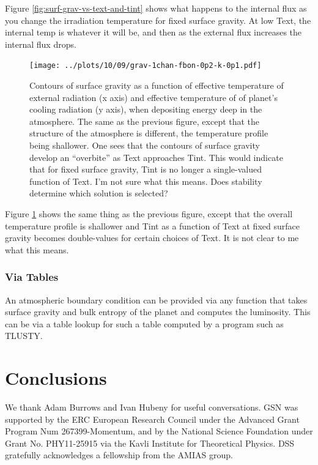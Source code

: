 \documentclass{emulateapj}
\begin{document}
Figure \ref{fig:surf-grav-vs-text-and-tint} shows what happens to the
internal flux as you change the irradiation temperature for fixed
surface gravity.  At low Text, the internal temp is whatever it will
be, and then as the external flux increases the internal flux drops.  

\begin{figure}
\texttt{[image: ../plots/10/09/grav-1chan-fbon-0p2-k-0p1.pdf]}
\caption{Contours of surface gravity as a function of effective
  temperature of external radiation (x axis) and effective temperature
  of of planet's cooling radiation (y axis), when depositing energy
  deep in the atmosphere.  The same as the previous figure, except
  that the structure of the atmosphere is different, the temperature
  profile being shallower.  One sees that the contours of surface
  gravity develop an ``overbite'' as Text approaches Tint.  This would
  indicate that for fixed surface gravity, Tint is no longer a
  single-valued function of Text.  I'm not sure what this means.  Does
  stability determine which solution is selected?}
\label{fig:surf-grav-vs-text-and-tint-shallow-temp-profile}
\end{figure}

Figure \ref{fig:surf-grav-vs-text-and-tint-shallow-temp-profile} shows
the same thing as the previous figure, except that the overall
temperature profile is shallower and Tint as a function of Text at
fixed surface gravity becomes double-values for certain choices of
Text.  It is not clear to me what this means.  

\subsubsection{Via Tables}

An atmospheric boundary condition can be provided via any function
that takes surface gravity and bulk entropy of the planet and computes
the luminosity.  This can be via a table lookup for such a table
computed by a program such as TLUSTY.

\section{Conclusions}
\label{sec:conc}

\acknowledgements

We thank Adam Burrows and Ivan Hubeny for useful conversations.  GSN
was supported by the ERC European Research Council under the Advanced
Grant Program Num 267399-Momentum, and by the National Science
Foundation under Grant No. PHY11-25915 via the Kavli Institute for
Theoretical Physics.  DSS gratefully acknowledges a fellowship from
the AMIAS group.




\clearpage
\end{document}
